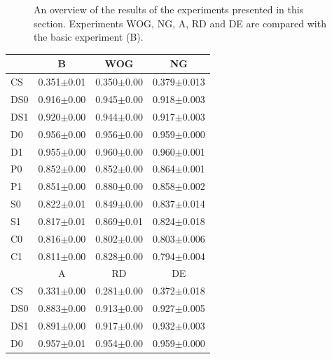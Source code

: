\begin{figure}
\caption{An overview of the results of the experiments presented in this section. Experiments WOG, NG, A, RD and DE are compared with the basic experiment (B).}
\label{f:par:int}
\end{figure}

\begin{table}
\centering
\begin{tabular}{||l|c|c|c||}
\hline\hline
         &B             &WOG           &NG\\\hline
CS       &0.351$\pm$0.01&0.350$\pm$0.00&0.379$\pm$0.013\\\hline
DS0      &0.916$\pm$0.00&0.945$\pm$0.00&0.918$\pm$0.003\\\hline
DS1      &0.920$\pm$0.00&0.944$\pm$0.00&0.917$\pm$0.003\\\hline
D0       &0.956$\pm$0.00&0.956$\pm$0.00&0.959$\pm$0.000\\\hline
D1       &0.955$\pm$0.00&0.960$\pm$0.00&0.960$\pm$0.001\\\hline
P0       &0.852$\pm$0.00&0.852$\pm$0.00&0.864$\pm$0.001\\\hline
P1       &0.851$\pm$0.00&0.880$\pm$0.00&0.858$\pm$0.002\\\hline
S0       &0.822$\pm$0.01&0.849$\pm$0.00&0.837$\pm$0.014\\\hline
S1       &0.817$\pm$0.01&0.869$\pm$0.01&0.824$\pm$0.018\\\hline
C0       &0.816$\pm$0.00&0.802$\pm$0.00&0.803$\pm$0.006\\\hline
C1       &0.811$\pm$0.00&0.828$\pm$0.00&0.794$\pm$0.004\\\hline
\hline
         &A             &RD            &DE\\\hline
CS       &0.331$\pm$0.00&0.281$\pm$0.00&0.372$\pm$0.018\\\hline
DS0      &0.883$\pm$0.00&0.913$\pm$0.00&0.927$\pm$0.005\\\hline
DS1      &0.891$\pm$0.00&0.917$\pm$0.00&0.932$\pm$0.003\\\hline
D0       &0.957$\pm$0.01&0.954$\pm$0.00&0.959$\pm$0.000\\\hline

\end{tabular}
\end{table}

